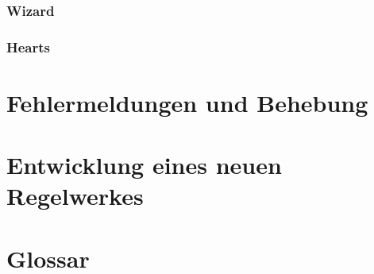 \documentclass[titlepage,10pt,a4paper]{article}
\begin{document}
\subsubsection{Wizard}
\subsubsection{Hearts}

\section{Fehlermeldungen und Behebung}

\section{Entwicklung eines neuen Regelwerkes}
   
\section{Glossar}
\end{document}
